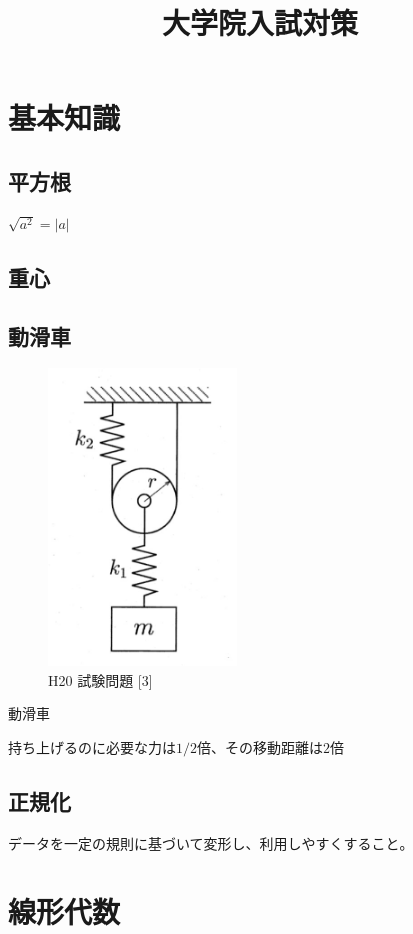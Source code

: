 \documentclass[a4paper]{jsarticle}
\author{}
\title{大学院入試対策}
\date{}
\begin{document}
\maketitle

\section{基本知識}
\subsection{平方根}
$\sqrt{a^2}=|a|$
\subsection{重心}
\subsection{動滑車}
\begin{figure}[htbp]
    \begin{center}
        \includegraphics[width=50mm]{images/kiriki_image1.jpg}
        \caption{H20 試験問題 [3]}
    \end{center}
\end{figure}
\begin{itembox}[l]{動滑車}
    \begin{center}
        持ち上げるのに必要な力は$1/2$倍、その移動距離は$2$倍
    \end{center}
\end{itembox}
\subsection{正規化}
データを一定の規則に基づいて変形し、利用しやすくすること。
\newpage
\section{線形代数}
\end{document}
